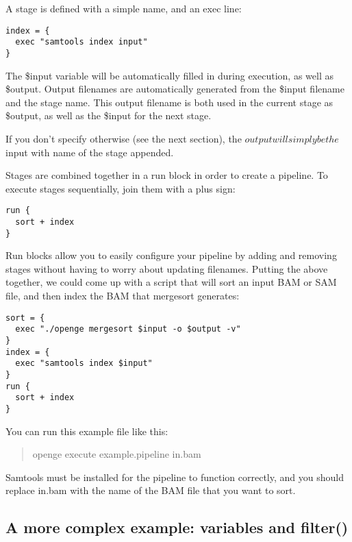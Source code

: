 \documentclass[11pt]{article}
\newcommand {\cmd}[1] {\begin{quote}#1\end{quote}}
\begin{document}
A stage is defined with a simple name, and an exec line:
\begin{verbatim}
index = {
  exec "samtools index input"
}
\end{verbatim}

The \$input variable will be automatically filled in during execution, as well as \$output. Output filenames are automatically generated from the \$input filename and the stage name. This output filename is both used in the current stage as \$output, as well as the \$input for the next stage.

If you don't specify otherwise (see the next section), the $output will simply be the $input with name of the stage appended.

Stages are combined together in a run block in order to create a pipeline. To execute stages sequentially, join them with a plus sign:
\begin{verbatim}
run {
  sort + index
}
\end{verbatim}
Run blocks allow you to easily configure your pipeline by adding and removing stages without having to worry about updating filenames. Putting the above together, we could come up with a script that will sort an input BAM or SAM file, and then index the BAM that mergesort generates:

\begin{verbatim}
sort = {
  exec "./openge mergesort $input -o $output -v"
}
index = {
  exec "samtools index $input"
}
run {
  sort + index
}
\end{verbatim}

You can run this example file like this:

\cmd{openge execute example.pipeline in.bam}

Samtools must be installed for the pipeline to function correctly, and you should replace in.bam with the name of the BAM file that you want to sort.

\subsection {A more complex example: variables and filter()}
\end{document}
